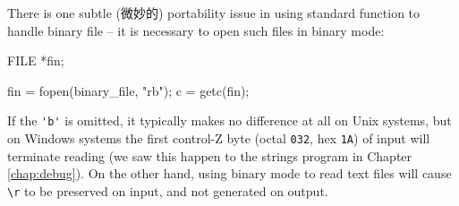 There is one subtle (微妙的) portability issue in using standard function
to handle binary file -- it is necessary to open such files in binary mode:
\begin{wellcode}
    FILE *fin;

    fin = fopen(binary_file, "rb");
    c = getc(fin);
\end{wellcode}

If the \verb"'b'" is omitted, it typically makes no difference at all on
Unix systems, but on Windows systems the first control-Z byte (octal
\verb'032', hex \verb'1A') of input will terminate reading (we saw this
happen to the strings program in Chapter \ref{chap:debug}). On the other
hand, using binary mode to read text files will cause \verb'\r' to be
preserved on input, and not generated on output.
